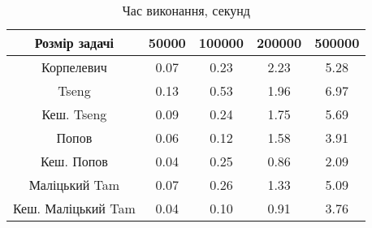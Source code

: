 \begin{table}[H]
	\centering
	\begin{tabular}{|c||c|c|c|c|}\hline
		Розмір задачі & 50000 & 100000 & 200000 & 500000 \\ \hline \hline
		Корпелевич & 0.07 & 0.23 & 2.23 & 5.28 \\ \hline
		Tseng & 0.13 & 0.53 & 1.96 & 6.97 \\ \hline
		Кеш. Tseng & 0.09 & 0.24 & 1.75 & 5.69 \\ \hline
		Попов & 0.06 & 0.12 & 1.58 & 3.91 \\ \hline
		Кеш. Попов & 0.04 & 0.25 & 0.86 & 2.09 \\ \hline
		Маліцький Tam & 0.07 & 0.26 & 1.33 & 5.09 \\ \hline
		Кеш. Маліцький Tam & 0.04 & 0.10 & 0.91 & 3.76 \\ \hline
	\end{tabular}
	\caption{Час виконання, секунд}
\end{table}

